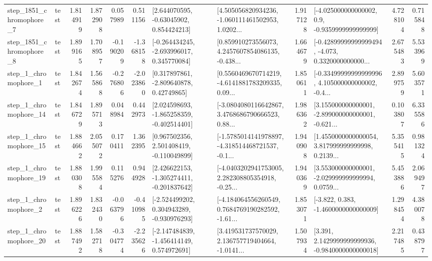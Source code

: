 \begin{tabular}{llrrrrllrlrr}
  step\_1851\_chromophore\_7 &      test &      1.814919 &    1.872908 &      0.057989 &  0.511156 &     [2.644070595, -0.63045902, 0.854424213] &  [4.505056820934236, -1.060111461502953, 1.0202... &       1.917128 &     [-4.025000000000002, 0.9, -0.9359999999999999] &            4.728104 &          0.715848 \\
  step\_1851\_chromophore\_8 &      test &      1.899165 &    1.708957 &     -0.190209 & -1.368158 &   [-0.264434245, -2.693996017, 0.345770084] &  [0.859910273556073, 4.2457607854086135, -0.438... &       1.664679 &  [-0.42899999999999494, -4.073, 0.3320000000000... &            2.675483 &          5.533969 \\
     step\_1\_chromophore\_1 &      test &      1.842674 &    1.565868 &     -0.276806 & -2.023860 &     [0.317897861, -2.809640878, 0.42749865] &  [0.5560469670714219, -4.6141881783209335, 0.09... &       1.850611 &  [-0.33499999999999996, 4.105000000000002, -0.4... &            2.899759 &          5.603571 \\
    step\_1\_chromophore\_14 &      test &      1.846729 &    1.895713 &      0.048984 &  0.442973 &   [2.024598693, -1.865258359, -0.402514401] &  [-3.0804080116642867, 3.4768686790666523, 0.88... &       1.986362 &  [3.155000000000001, -2.899000000000001, -0.621... &            0.103807 &          6.335586 \\
    step\_1\_chromophore\_15 &      test &      1.884662 &    2.055072 &      0.170411 &  1.362395 &    [0.967502356, 2.501408419, -0.110049899] &  [-1.5785014141978897, -4.318514468721537, -0.1... &       1.940908 &  [1.4550000000000054, 3.817999999999998, 0.2139... &            5.355415 &          0.981324 \\
    step\_1\_chromophore\_19 &      test &      1.880308 &    1.995584 &      0.115276 &  0.944928 &   [2.426622153, -1.305274411, -0.201837642] &  [-4.0403202941753005, 2.282308805354918, -0.25... &       1.940369 &  [3.553000000000001, -2.029999999999994, 0.0759... &            5.453886 &          2.069497 \\
     step\_1\_chromophore\_2 &      test &      1.896226 &    1.832430 &     -0.063796 & -0.410985 &   [-2.524499202, 0.304943289, -0.930976293] &  [-4.184064556260549, 0.7684769190282592, -1.61... &       1.853071 &               [-3.822, 0.383, -1.4600000000000009] &            1.298454 &          4.380078 \\
    step\_1\_chromophore\_20 &      test &      1.887492 &    1.582718 &     -0.304774 & -2.235626 &   [-2.147484839, -1.456414149, 0.574972691] &  [3.419531737570029, 2.136757719404664, -1.0141... &       1.507934 &   [3.391, 2.1429999999999936, -0.9840000000000018] &            2.217485 &          0.438797 \\

\end{tabular}
